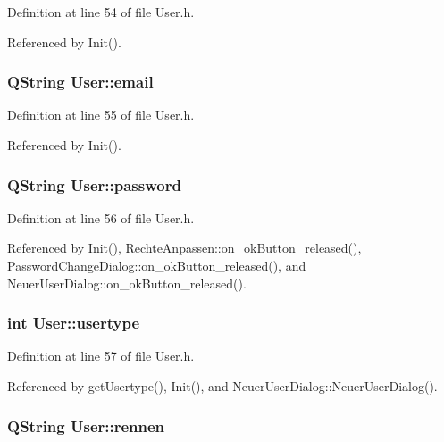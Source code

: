 Definition at line 54 of file User.h.

Referenced by Init().\hypertarget{class_user_5b7a66a134d017ae18c2d1464f34eb67}{
\subsubsection[email]{\setlength{\rightskip}{0pt plus 5cm}QString {\bf User::email}}}
\label{class_user_5b7a66a134d017ae18c2d1464f34eb67}




Definition at line 55 of file User.h.

Referenced by Init().\hypertarget{class_user_c887622f22a898c097d156ad964be846}{
\subsubsection[password]{\setlength{\rightskip}{0pt plus 5cm}QString {\bf User::password}}}
\label{class_user_c887622f22a898c097d156ad964be846}




Definition at line 56 of file User.h.

Referenced by Init(), RechteAnpassen::on\_\-okButton\_\-released(), PasswordChangeDialog::on\_\-okButton\_\-released(), and NeuerUserDialog::on\_\-okButton\_\-released().\hypertarget{class_user_29cdee57f89b7c6f43eb656c7658ed60}{
\subsubsection[usertype]{\setlength{\rightskip}{0pt plus 5cm}int {\bf User::usertype}}}
\label{class_user_29cdee57f89b7c6f43eb656c7658ed60}




Definition at line 57 of file User.h.

Referenced by getUsertype(), Init(), and NeuerUserDialog::NeuerUserDialog().\hypertarget{class_user_b5f525a8d6723eada2dd17ecb057a464}{
\subsubsection[rennen]{\setlength{\rightskip}{0pt plus 5cm}QString {\bf User::rennen}}}
\label{class_user_b5f525a8d6723eada2dd17ecb057a464}




